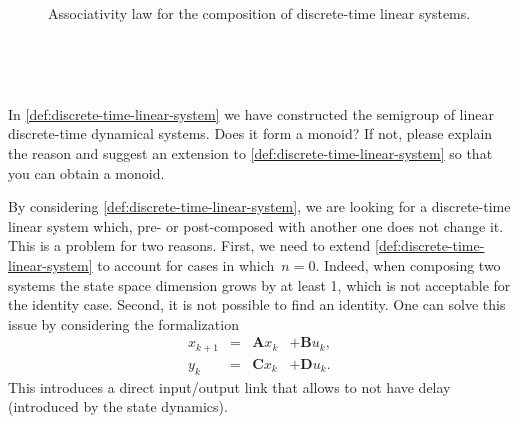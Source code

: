 \begin{comment}
        \end{bmatrix}\mat{u}_k, \\
        \mat{w}_k                         & =
        \begin{bmatrix}
            \mat{0} & \mat{0} & \mat{J}
        \end{bmatrix}
        \begin{bmatrix}
            \mat{x}_k \\ \mat{z}_k\\ \mat{s}_k
        \end{bmatrix},
    \end{aligned}
\end{equation*}
showing associativity.
\end{comment}

\begin{figure}[tbh]
    \centering
    \prflinepadbefore=5pt
    \prflinepadafter=5pt
    {
    }
    \caption{Associativity law for the composition of discrete-time linear systems. }
    \label{fig:ass_dyn_syst}
\end{figure}

\

\

\begin{exercise}
    In \cref{def:discrete-time-linear-system} we have constructed the semigroup of linear discrete-time dynamical systems.
    Does it form a monoid?
    If not, please explain the reason and suggest an extension to \cref{def:discrete-time-linear-system} so that you can obtain a monoid.
\end{exercise}
\begin{solution}
    By considering \cref{def:discrete-time-linear-system}, we are looking for a discrete-time linear system which, pre- or post-composed with another one does not change it.
    This is a problem for two reasons.
    First, we need to extend \cref{def:discrete-time-linear-system} to account for cases in which~$n=0$.
    Indeed, when composing two systems the state space dimension grows by at least 1, which is not acceptable for the identity case.
    Second, it is not possible to find an identity.
    One can solve this issue by considering the formalization
    \begin{equation}
        \label{eq:discrete-time-dynamics-D}
        \begin{aligned}
            x_{k+1} & = & \mathbf{A} x_k & + \mathbf{B} u_k, \\
            y_{k}   & = & \mathbf{C} x_k & + \mathbf{D} u_k.
        \end{aligned}
    \end{equation}
    This introduces a direct input/output link that allows to not have delay (introduced by the state dynamics).
\end{solution}

